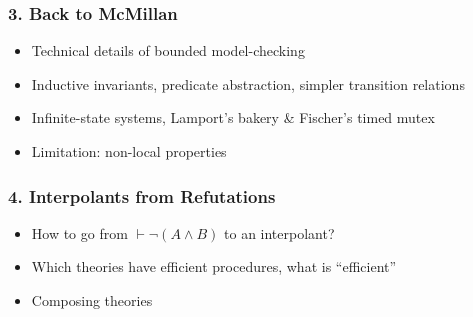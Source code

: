 \documentclass{article}
\begin{document}
\subsubsection*{3. Back to McMillan}
\begin{itemize}
\item Technical details of bounded model-checking
\item Inductive invariants, predicate abstraction, simpler transition relations
\item Infinite-state systems, Lamport's bakery \& Fischer's timed mutex
\item Limitation: non-local properties
\end{itemize}


\subsubsection*{4. Interpolants from Refutations}
\begin{itemize}
\item How to go from $\vdash \neg(A \wedge B)$ to an interpolant?
\item Which theories have efficient procedures, what is ``efficient''
\item Composing theories
\end{itemize}
\end{document}
